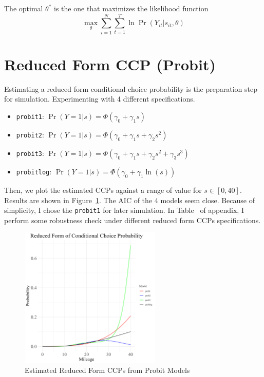 \documentclass[12pt]{article}[margin=1in]
\begin{document}
The optimal $\theta^*$ is the one that maximizes the likelihood function
\begin{equation}\label{eq:likelihood}
    \max_{\theta} \sum_{i=1}^N \sum_{t=1}^T \ln \Pr(Y_{it}|s_{it},\theta)
\end{equation}

\section{Reduced Form CCP (Probit)}

Estimating a reduced form conditional choice probability is the preparation
step for simulation. Experimenting with 4 different specifications.
\begin{itemize}
    \item \verb|probit1|: $\Pr(Y=1|s) = \Phi(\gamma_0 + \gamma_1 s)$
    \item \verb|probit2|: $\Pr(Y=1|s) = \Phi(\gamma_0 + \gamma_1 s + \gamma_2 s^2)$
    \item \verb|probit3|: $\Pr(Y=1|s) = \Phi(\gamma_0 + \gamma_1 s + \gamma_2 s^2 + \gamma_3 s^3)$
    \item \verb|probitlog|: $\Pr(Y=1|s) = \Phi(\gamma_0 + \gamma_1 \ln(s))$
\end{itemize}
Then, we plot the estimated CCPs against a range of value for $s\in[0,40]$. Results are shown in Figure~\ref{fig:ccp_probit}. The AIC of the 4 models seem close. Because of simplicity, I chose the \verb|probit1| for later simulation. In Table~\label{tab:comparison} of appendix, I perform some robustness check under different reduced form CCPs specifications.
\begin{figure}[!htbp]
    \centering
    \includegraphics[width=0.6\textwidth]{../Figures/ccp_probit.png}
    \caption{Estimated Reduced Form CCPs from Probit Models}
    \label{fig:ccp_probit}
\end{figure}
\end{document}

